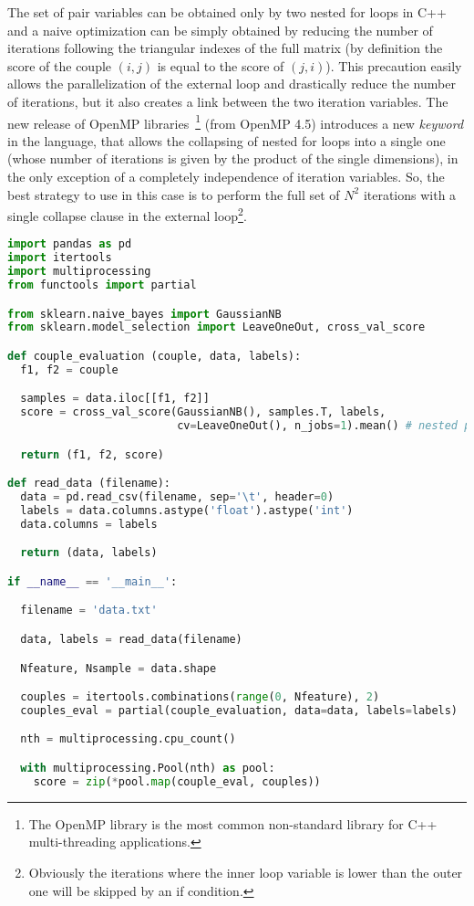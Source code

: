 \documentclass{standalone}
\begin{document}
The set of pair variables can be obtained only by two nested for loops in \textsf{C++} and a naive optimization can be simply obtained by reducing the number of iterations following the triangular indexes of the full matrix (by definition the score of the couple $(i, j)$ is equal to the score of $(j, i)$).
This precaution easily allows the parallelization of the external loop and drastically reduce the number of iterations, but it also creates a link between the two iteration variables.
The new release of OpenMP libraries~\cite{OpenMP}\footnote{
  The OpenMP library is the most common non-standard library for \textsf{C++} multi-threading applications.
} (from OpenMP 4.5) introduces a new \emph{keyword} in the language, that allows the collapsing of nested for loops into a single one (whose number of iterations is given by the product of the single dimensions), in the only exception of a completely independence of iteration variables.
So, the best strategy to use in this case is to perform the full set of $N^2$ iterations with a single \textsf{collapse} clause in the external loop\footnote{
  Obviously the iterations where the inner loop variable is lower than the outer one will be skipped by an if condition.
}.

\lstset{style=snippet}
\begin{lstlisting}[language=Python, caption=Python parallel couples evaluation algorithm, label=code:py_couples]
import pandas as pd
import itertools
import multiprocessing
from functools import partial

from sklearn.naive_bayes import GaussianNB
from sklearn.model_selection import LeaveOneOut, cross_val_score

def couple_evaluation (couple, data, labels):
  f1, f2 = couple

  samples = data.iloc[[f1, f2]]
  score = cross_val_score(GaussianNB(), samples.T, labels,
                          cv=LeaveOneOut(), n_jobs=1).mean() # nested parallel loops are not allowed

  return (f1, f2, score)

def read_data (filename):
  data = pd.read_csv(filename, sep='\t', header=0)
  labels = data.columns.astype('float').astype('int')
  data.columns = labels

  return (data, labels)

if __name__ == '__main__':

  filename = 'data.txt'

  data, labels = read_data(filename)

  Nfeature, Nsample = data.shape

  couples = itertools.combinations(range(0, Nfeature), 2)
  couples_eval = partial(couple_evaluation, data=data, labels=labels)

  nth = multiprocessing.cpu_count()

  with multiprocessing.Pool(nth) as pool:
    score = zip(*pool.map(couple_eval, couples))

\end{lstlisting}
\end{document}
